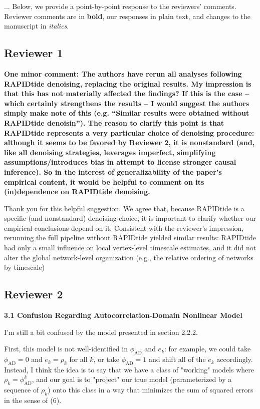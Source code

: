 \documentclass[docs/main.tex]{subfiles}
\newcommand{\reviewercomment}[1]{\vspace{0.3cm}\noindent\textbf{#1}\vspace{0.15cm}}
\begin{document}
...
Below, we provide a point-by-point response to the reviewers’ comments. Reviewer comments are in \textbf{bold}, our responses in plain text, and changes to the manuscript in \textit{italics}.

\subsection*{Reviewer 1}

\reviewercomment{
One minor comment: The authors have rerun all analyses following RAPIDtide denoising, replacing the original results. My impression is that this has not materially affected the findings? If this is the case -- which certainly strengthens the results -- I would suggest the authors simply make note of this (e.g. ``Similar results were obtained without RAPIDtide denoisin''). The reason to clarify this point is that RAPIDtide represents a very particular choice of denoising procedure: although it seems to be favored by Reviewer 2, it is nonstandard (and, like all denoising strategies, leverages imperfect, simplifying assumptions/introduces bias in attempt to license stronger causal inference). So in the interest of generalizability of the paper's empirical content, it would be helpful to comment on its (in)dependence on RAPIDtide denoising.}

Thank you for this helpful suggestion. We agree that, because RAPIDtide is a specific (and nonstandard) denoising choice, it is important to clarify whether our empirical conclusions depend on it. Consistent with the reviewer’s impression, rerunning the full pipeline without RAPIDtide yielded similar results: RAPIDtide had only a small influence on local vertex-level timescale estimates, and it did not alter the global network-level organization (e.g., the relative ordering of networks by timescale)

\subsection*{Reviewer 2}
\textbf{3.1 Confusion Regarding Autocorrelation-Domain Nonlinear Model}

 I'm still a bit confused by the model presented in section 2.2.2.

 First, this model is not well-identified in \(\phi_{\text{AD}}\) and
 \(e_{k}\): for example, we could take \(\phi_{\text{AD}} = 0\) and
 \(e_{k} = \rho_{k}\) for all \(k\), or take \(\phi_{\text{AD}} = 1\)
 and shift all of the \(e_{k}\) accordingly. Instead, I think the idea
 is to say that we have a class of "working" models where \(\rho_{k} =
 \phi_{\text{AD}}^{k}\), and our goal is to "project" our true model
 (parameterized by a sequence of \(\rho_{k}\)) onto this class in a way
 that minimizes the sum of squared errors in the sense of (6).
\end{document}
